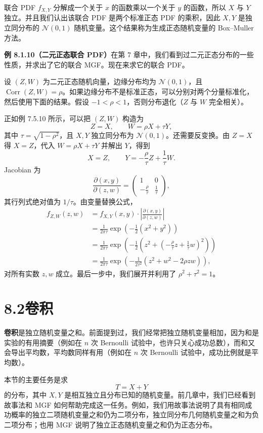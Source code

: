\documentclass[UTF8,12pt,a4paper,fontset=fandol]{ctexart}
\begin{document}
联合 PDF $f_{X,Y}$ 分解成一个关于 $x$ 的函数乘以一个关于 $y$ 的函数，所以 $X$ 与 $Y$ 独立。并且我们认出该联合 PDF 是两个标准正态 PDF 的乘积，因此 $X,Y$ 是独立同分布的 $\mathcal N(0,1)$ 随机变量。这个结果称为生成正态随机变量的 Box--Muller 方法。

\noindent\textbf{例 8.1.10（二元正态联合 PDF）}\quad 在第 7 章中，我们看到过二元正态分布的一些性质，并求出了它的联合 MGF。现在来求它的联合 PDF。

设 $(Z,W)$ 为二元正态随机向量，边缘分布均为 $\mathcal N(0,1)$，且 $\operatorname{Corr}(Z,W)=\rho$。如果边缘分布不是标准正态，可以分别对两个分量标准化，然后使用下面的结果。假设 $-1<\rho<1$，否则分布退化（$Z$ 与 $W$ 完全相关）。

正如例 7.5.10 所示，可以把 $(Z,W)$ 构造为
\[
  Z=X,\qquad W=\rho X+\tau Y,
\]
其中 $\tau=\sqrt{1-\rho^2}$，且 $X,Y$ 独立同分布为 $\mathcal N(0,1)$。还需要反变换。由 $Z=X$ 得 $X=Z$，代入 $W=\rho X+\tau Y$ 并解出 $Y$，得到
\[
  X=Z,\qquad Y=-\frac{\rho}{\tau}Z+\frac1{\tau}W.
\]
Jacobian 为
\[
  \frac{\partial(x,y)}{\partial(z,w)}
  =
  \begin{pmatrix}
    1 & 0\\
    -\frac{\rho}{\tau} & \frac1{\tau}
  \end{pmatrix},
\]
其行列式绝对值为 $1/\tau$。由变量替换公式，
\[
\begin{aligned}
  f_{Z,W}(z,w)
  &=f_{X,Y}(x,y)\cdot
    \left|\frac{\partial(x,y)}{\partial(z,w)}\right|\\
  &=\frac{1}{2\pi\tau}\exp\left(-\frac12(x^2+y^2)\right)\\
  &=\frac{1}{2\pi\tau}\exp\left(
    -\frac12\left(z^2+\left(-\frac{\rho}{\tau}z+\frac1{\tau}w\right)^2\right)\right)\\
  &=\frac{1}{2\pi\tau}\exp\left(
    -\frac{1}{2\tau^2}(z^2+w^2-2\rho zw)\right),
\end{aligned}
\]
对所有实数 $z,w$ 成立。最后一步中，我们展开并利用了 $\rho^2+\tau^2=1$。

\section*{8.2\quad 卷积}

\textbf{卷积}是独立随机变量之和。前面提到过，我们经常把独立随机变量相加，因为和是实验的有用摘要（例如在 $n$ 次 Bernoulli 试验中，也许只关心成功总数），而和又会导出平均数，平均数同样有用（例如在 $n$ 次 Bernoulli 试验中，成功比例就是平均数）。

本节的主要任务是求
\[
  T=X+Y
\]
的分布，其中 $X,Y$ 是相互独立且分布已知的随机变量。前几章中，我们已经看到故事法和 MGF 如何帮助完成这一任务。例如，我们用故事法说明了具有相同成功概率的独立二项随机变量之和仍为二项分布，独立同分布几何随机变量之和为负二项分布；也用 MGF 说明了独立正态随机变量之和仍为正态分布。
\end{document}
